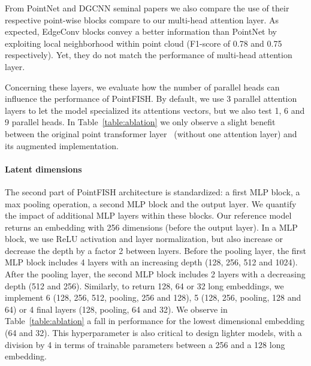 From PointNet and DGCNN seminal papers we also compare the use of their respective point-wise blocks compare to our multi-head attention layer.
As expected, EdgeConv blocks convey a better information than PointNet by exploiting local neighborhood within point cloud (F1-score of 0.78 and 0.75 respectively).
Yet, they do not match the performance of multi-head attention layer.

Concerning these layers, we evaluate how the number of parallel heads can influence the performance of PointFISH.
By default, we use 3 parallel attention layers to let the model specialized its attentions vectors, but we also test 1, 6 and 9 parallel heads.
In Table~\ref{table:ablation} we only observe a slight benefit between the original point transformer layer~\cite{Zhao_2021_ICCV} (without one attention layer) and its augmented implementation.


\paragraph{Latent dimensions}

The second part of PointFISH architecture is standardized: a first MLP block, a max pooling operation, a second MLP block and the output layer.
We quantify the impact of additional MLP layers within these blocks.
Our reference model returns an embedding with 256 dimensions (before the output layer).
In a MLP block, we use ReLU activation and layer normalization, but also increase or decrease the depth by a factor 2 between layers.
Before the pooling layer, the first MLP block includes 4 layers with an increasing depth (128, 256, 512 and 1024).
After the pooling layer, the second MLP block includes 2 layers with a decreasing depth (512 and 256).
Similarly, to return 128, 64 or 32 long embeddings, we implement 6 (128, 256, 512, pooling, 256 and 128), 5 (128, 256, pooling, 128 and 64) or 4 final layers (128, pooling, 64 and 32).
We observe in Table~\ref{table:ablation} a fall in performance for the lowest dimensional embedding (64 and 32).
This hyperparameter is also critical to design lighter models, with a division by 4 in terms of trainable parameters between a 256 and a 128 long embedding.

